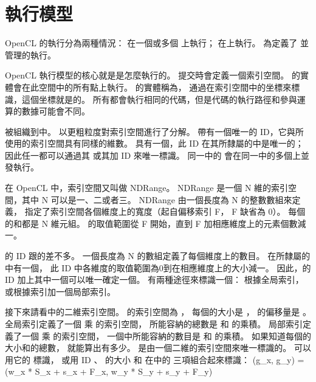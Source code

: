 
\section{執行模型}
OpenCL 的執行分為兩種情況：
在一個或多個 {} 上執行；
在上執行。
為定義了
並管理的執行。

OpenCL 執行模型的核心就是是怎麼執行的。
提交時會定義一個索引空間。
的實體會在此空間中的所有點上執行。
的實體稱為，
通過在索引空間中的坐標來標識，這個坐標就是的。
所有都會執行相同的代碼，但是代碼的執行路徑和參與運算的數據可能會不同。

被組織到中。
以更粗粒度對索引空間進行了分解。
帶有一個唯一的 ID，它與所使用的索引空間具有同樣的維數。
具有一個，此 ID 在其所隸屬的中是唯一的；
因此任一都可以通過其
或其加 ID 來唯一標識。
同一中的
會在同一中的多個上並發執行。

在 OpenCL 中，索引空間又叫做 NDRange。
 NDRange 是一個 N 維的索引空間，其中 N 可以是一、二或者三。
 NDRange 由一個長度為 N 的整數數組來定義，
指定了索引空間各個維度上的寬度（起自偏移索引 F， F 缺省為 0）。
每個的和都是 N 維元組。
的取值範圍從 F 開始，直到 F 加相應維度上的元素個數減一。

的 ID 跟的差不多。
一個長度為 N 的數組定義了每個維度上的數目。
在所隸屬的中有一個，
此 ID 中各維度的取值範圍為0到在相應維度上的大小減一。
因此，的 ID 加上其中一個可以唯一確定一個。
有兩種途徑來標識一個：
根據全局索引，或根據索引加一個局部索引。

接下來請看中的二維索引空間。
的索引空間為 ，
每個的大小是 ，
的偏移量是 。
全局索引定義了一個  乘  的索引空間，
所能容納的總數是  和  的乘積。
局部索引定義了一個  乘  的索引空間，
一個中所能容納的數目是  和  的乘積。
如果知道每個的大小和的總數，
就能算出有多少。
是由一個二維的索引空間來唯一標識的。
可以用它的  標識，
或用 ID 、
的大小  和
在中的  三項組合起來標識：
\startformula
(g_x, g_y) = (w_x * S_x + s_x + F_x, w_y * S_y + s_y + F_y)
\stopformula


